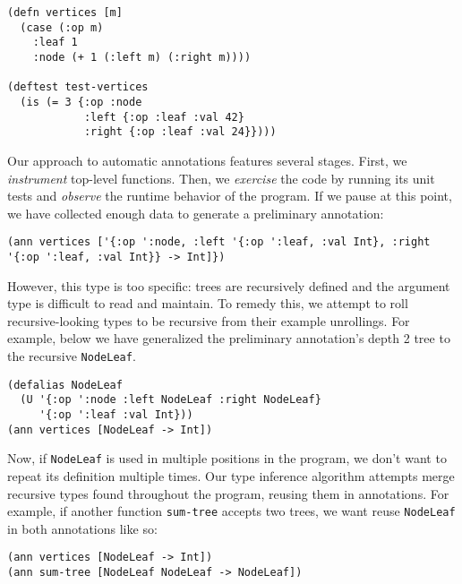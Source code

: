 \documentclass[9pt]{extarticle}
\begin{document}
\begin{Verbatim}
(defn vertices [m]
  (case (:op m)
    :leaf 1
    :node (+ 1 (:left m) (:right m))))

(deftest test-vertices
  (is (= 3 {:op :node
            :left {:op :leaf :val 42} 
            :right {:op :leaf :val 24}})))
\end{Verbatim}

Our approach to automatic annotations features several stages.
First, we \textit{instrument} top-level functions.
Then, we \textit{exercise} the code by running its unit tests and \textit{observe}
the runtime behavior of the program.
If we pause at this point, we have collected enough data 
to generate a preliminary annotation:
%
\begin{Verbatim}
(ann vertices ['{:op ':node, :left '{:op ':leaf, :val Int}, :right '{:op ':leaf, :val Int}} -> Int]})
\end{Verbatim}
%
However, this type is too specific: trees are recursively defined
and the argument type is difficult to read and maintain.
To remedy this, we attempt to roll recursive-looking
types to be recursive from their example unrollings.
For example, below we have generalized the preliminary annotation's
depth 2 tree to the recursive \texttt{NodeLeaf}.
%
\begin{Verbatim}
(defalias NodeLeaf 
  (U '{:op ':node :left NodeLeaf :right NodeLeaf}
     '{:op ':leaf :val Int}))
(ann vertices [NodeLeaf -> Int])
\end{Verbatim}
%
%
Now, if \texttt{NodeLeaf} is used in multiple positions
in the program, we don't want to repeat its definition multiple times.
Our type inference algorithm attempts merge recursive
types found throughout the program, reusing them in annotations.
For example,
if another function \texttt{sum-tree} accepts two
trees, we want reuse \texttt{NodeLeaf} in both annotations
like so:
%
\begin{Verbatim}
(ann vertices [NodeLeaf -> Int])
(ann sum-tree [NodeLeaf NodeLeaf -> NodeLeaf])
\end{Verbatim}
\end{document}
